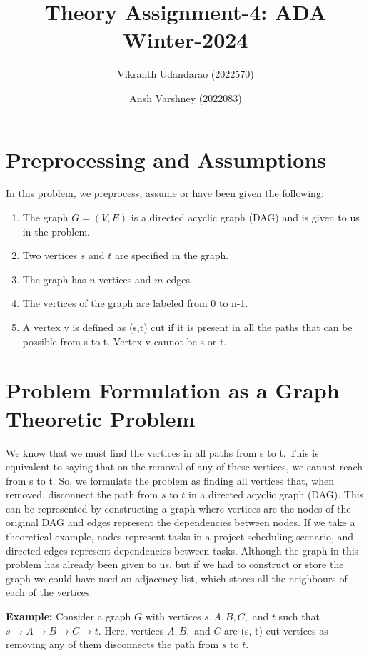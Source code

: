 \documentclass{article}
\title{Theory Assignment-4: ADA Winter-2024}
\author{Vikranth Udandarao (2022570) \and Ansh Varshney (2022083)}
\date{}
\begin{document}
\maketitle


\section{Preprocessing and Assumptions}
    In this problem, we preprocess, assume or have been given the following:

    \begin{enumerate}
        \item The graph $G = (V, E)$ is a directed acyclic graph (DAG) and is given to us in the problem.
        \item Two vertices $s$ and $t$ are specified in the graph.
        \item The graph has $n$ vertices and $m$ edges.
        \item The vertices of the graph are labeled from 0 to n-1.
        \item A vertex v is defined as (s,t) cut if it is present in all the paths that can be possible from s to t. Vertex v cannot be s or t.
    \end{enumerate}


\section{Problem Formulation as a Graph Theoretic Problem}
    We know that we must find the vertices in all paths from s to t. This is equivalent to saying that on the removal of any of these vertices, we cannot reach from s to t. So, we formulate the problem as finding all vertices that, when removed, disconnect the path from $s$ to $t$ in a directed acyclic graph (DAG). This can be represented by constructing a graph where vertices are the nodes of the original DAG and edges represent the dependencies between nodes. If we take a theoretical example, nodes represent tasks in a project scheduling scenario, and directed edges represent dependencies between tasks. Although the graph in this problem has already been given to us, but if we had to construct or store the graph we could have used an adjacency list, which stores all the neighbours of each of the vertices.

    \textbf{Example:}
        Consider a graph $G$ with vertices $s, A, B, C,$ and $t$ such that $s \rightarrow A \rightarrow B \rightarrow C \rightarrow t$. Here, vertices $A, B,$ and $C$ are (s, t)-cut vertices as removing any of them disconnects the path from $s$ to $t$.
\end{document}
